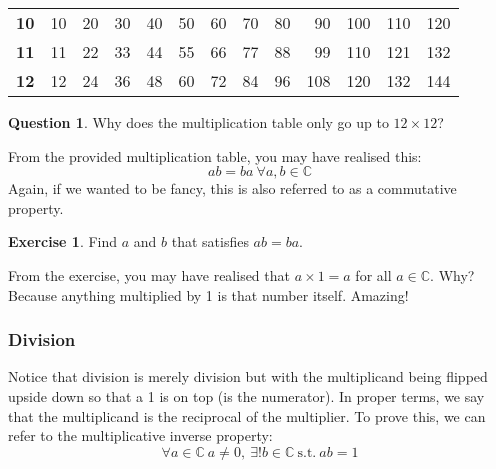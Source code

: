 \documentclass[a4paper]{article}
\theoremstyle{plain}
\theoremstyle{definition}
\newtheorem{question}{Question}[section]
\newtheorem{exercise}{Exercise}[section]
\theoremstyle{remark}
\newcommand{\subsectionSpace}{\vspace{0.5em}}
\begin{document}
\begin{table}[H]
\begin{tabular}{r|rrrrrrrrrrrr}
            \textbf{10} & 10         & 20         & 30         & 40         & 50         & 60         & 70         & 80         & 90         & 100         & 110         & 120         \\
            \textbf{11} & 11         & 22         & 33         & 44         & 55         & 66         & 77         & 88         & 99         & 110         & 121         & 132         \\
            \textbf{12} & 12         & 24         & 36         & 48         & 60         & 72         & 84         & 96         & 108        & 120         & 132         & 144        
            \end{tabular}
        \end{table}

        \begin{question}
            Why does the multiplication table only go up to $12\times 12$?
        \end{question}

        From the provided multiplication table, you may have realised this:
        $$ab = ba \ \forall a, b \in \mathbb{C}$$
        Again, if we wanted to be fancy, this is also referred to as a commutative property.

        \begin{exercise}
            Find $a$ and $b$ that satisfies $ab=ba$.
        \end{exercise}

        From the exercise, you may have realised that $a\times 1 = a$ for all $a\in \mathbb{C}$. Why? Because anything multiplied by 1 is that number itself. Amazing!

        \subsubsection{Division}
        Notice that division is merely division but with the multiplicand being flipped upside down so that a 1 is on top (is the numerator). In proper terms, we say that the multiplicand is the reciprocal of the multiplier. To prove this, we can refer to the multiplicative inverse property:
        $$\forall a \in \mathbb{C} \ a\neq 0, \ \exists !b \in \mathbb{C} \ \mathrm{s.t.} \ ab=1$$


        \subsectionSpace
\end{document}
